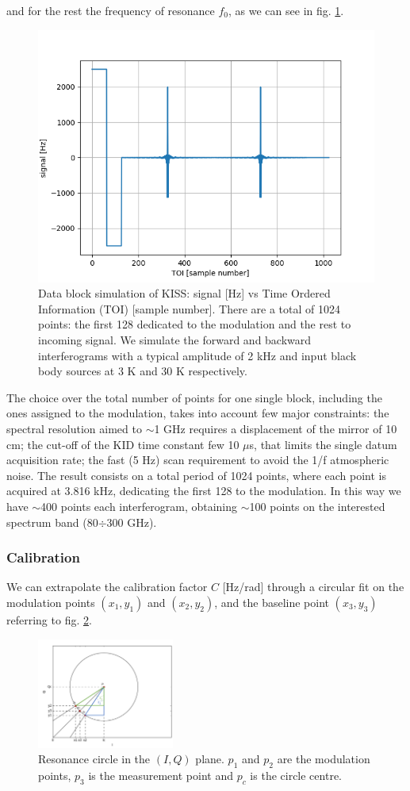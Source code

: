 \documentclass[twocolumn,traditabstract]{aa}\\
\begin{document}
\noindent and for the rest the frequency of resonance $f_0$, as we can see in fig. \ref{fig:mod}.

\begin{figure}[htf]
	\centering
	\includegraphics[width=.5\textwidth]{3.acqui/block_data.png}
	\caption{Data block simulation of KISS: signal [Hz] vs Time Ordered Information (TOI) [sample number]. There are a total of 1024 points: the first 128 dedicated to the modulation and the rest to incoming signal. We simulate the forward and backward interferograms with a typical amplitude of 2 kHz and input black body sources at 3 K and 30 K respectively.}
	\label{fig:mod}
\end{figure}

\noindent The choice over the total number of points for one single block, including the ones assigned to the modulation, takes into account few major constraints: the spectral resolution aimed to $\sim$1 GHz requires a displacement of the mirror of 10 cm; the cut-off of the KID time constant few 10 $\mu$s, that limits the single datum acquisition rate; the fast (5 Hz) scan requirement to avoid the 1/f atmospheric noise. The result consists on a total period of 1024 points, where each point is acquired at 3.816 kHz, dedicating the first 128 to the modulation. In this way we have $\sim$400 points each interferogram, obtaining $\sim$100 points on the interested spectrum band (80$\div$300 GHz).

\subsubsection{Calibration}
\label{calib}

\noindent We can extrapolate the calibration factor $C$ [Hz/rad] through a circular fit on the modulation points $(x_1,y_1)$ and $(x_2,y_2)$, and the baseline point $(x_3,y_3)$ referring to fig. \ref{fig:IQ_modulation}. 

\begin{figure}[htf]
	\centering
	\includegraphics[width=0.4\textwidth]{3.acqui/circle.png}
	\caption{Resonance circle in the $(I,Q)$ plane. $p_1$ and $p_2$ are the modulation points, $p_3$ is the measurement point and $p_c$ is the circle centre. }
	\label{fig:IQ_modulation}
\end{figure}
\end{document}

